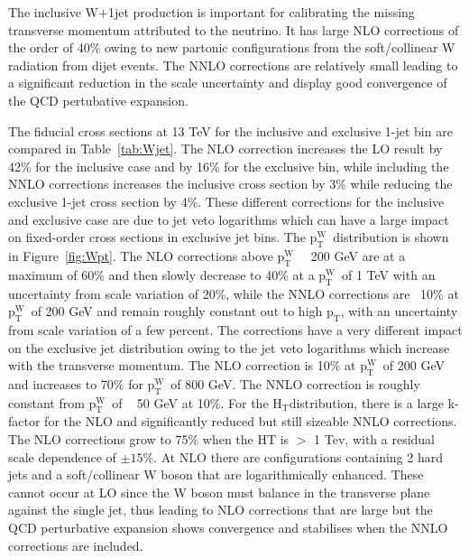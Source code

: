 \documentclass[a4paper,11pt,notoc]{article}
\newcommand{\pt}{\ensuremath{\mathrm{p_T}}}
\newcommand{\ptW}{\ensuremath{\mathrm{p_T^{W}}}}
\newcommand{\Ht}{\ensuremath{\mathrm{H_T}}}
\begin{document}
The inclusive W+1jet production is important for calibrating the missing transverse momentum attributed to the neutrino. It has large NLO corrections of the order of 40\% owing to new partonic configurations from the soft/collinear W radiation from dijet events. The NNLO corrections are relatively small leading to a significant reduction in the scale uncertainty and display good convergence of the QCD pertubative expansion. %

The fiducial cross sections at 13 TeV for the inclusive and exclusive 1-jet bin are compared in Table~\ref{tab:Wjet}. The NLO correction increases the LO result by 42\% for the inclusive case and by 16\% for the exclusive bin, while including the NNLO corrections increases the inclusive cross section by 3\% while reducing the exclusive 1-jet cross section by 4\%. These different corrections for the inclusive and exclusive case are due to jet veto logarithms which can have a large impact on fixed-order cross sections in exclusive jet bins. The \ptW\ distribution is shown in Figure~\ref{fig:Wpt}. The NLO corrections above \ptW\ ~ 200 GeV are at a maximum of 60\% and then slowly decrease to 40\% at a \ptW\ of 1 TeV with an uncertainty from scale variation of 20\%, while the NNLO corrections are ~10\% at \ptW\ of 200 GeV and remain roughly constant out to high \pt, with an uncertainty from scale variation of a few percent. The corrections have a very different impact on the exclusive jet distribution owing to the jet veto logarithms which increase with the transverse momentum. The NLO correction is 10\% at \ptW\ of 200 GeV and increases to 70\% for \ptW\ of 800 GeV. The NNLO correction is roughly constant from \ptW\ of ~ 50 GeV at 10\%. For the \Ht distribution, there is a large k-factor for the NLO and significantly reduced but still sizeable NNLO corrections. The NLO corrections grow to 75\% when the HT is $>$ 1 Tev, with a residual scale dependence of $\pm 15\%$. %
At NLO there are configurations containing 2 hard jets and a soft/collinear W boson that are logarithmically enhanced. These cannot occur at LO since the W boson must balance in the transverse plane against the single jet, thus leading to NLO corrections that are large but the QCD perturbative expansion shows convergence and stabilises when the NNLO corrections are included. 
\end{document}
